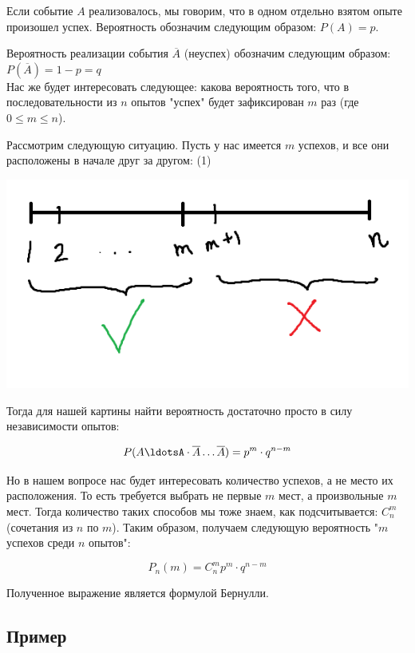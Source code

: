 \documentclass{article}
\begin{document}
Если событие $A$ реализовалось, мы говорим, что в одном отдельно взятом опыте произошел успех. Вероятность обозначим следующим образом: $P(A) = p$.

Вероятность реализации события $\overline{A}$ (неуспех) обозначим следующим образом: $P(\overline{A}) = 1 - p = q$
\\

Нас же будет интересовать следующее: какова вероятность того, что в последовательности из $n$ опытов "успех" будет зафиксирован $m$ раз (где $0 \leq m \leq n$).

Рассмотрим следующую ситуацию. Пусть у нас имеется $m$ успехов, и все они расположены в начале друг за другом: (1)

\begin{center}
    \includegraphics[scale=0.6]{3.png}
\end{center}

Тогда для нашей картины найти вероятность достаточно просто в силу независимости опытов:

$$P(A\ldotsA\cdot\overline{A}\ldots\overline{A}) = p^m \cdot q^{n - m}$$

Но в нашем вопросе нас будет интересовать количество успехов, а не место их расположения. То есть требуется выбрать не первые $m$ мест, а произвольные $m$ мест. Тогда количество таких способов мы тоже знаем, как подсчитывается: $C_n^m$ (сочетания из $n$ по $m$). Таким образом, получаем следующую вероятность "$m$ успехов среди $n$ опытов":

$$P_n(m) = C_n^m p^m \cdot q^{n - m} $$

Полученное выражение является формулой Бернулли.

\subsection{Пример}
\end{document}
